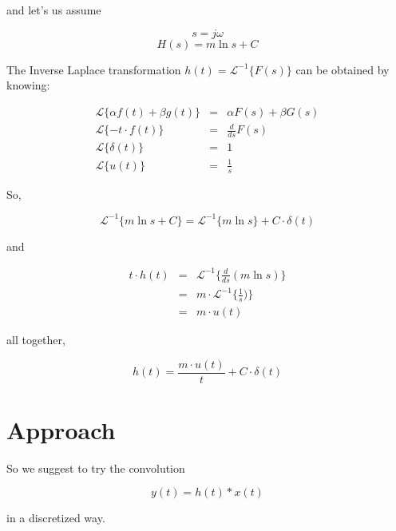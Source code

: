 \documentclass[a4paper,10pt]{article}
\newcommand{\laplace}{\mathcal{L}}
\begin{document}
and let's us assume

$$ s = j\omega $$
$$ H(s) = m \ln{s} + C $$

The Inverse Laplace transformation $h(t) = \laplace^{-1} \lbrace F(s) \rbrace $ can be obtained
by knowing:

\begin{eqnarray}
\laplace \lbrace \alpha f(t) + \beta g(t) \rbrace & = & \alpha F(s) + \beta G(s) \\
\laplace \lbrace -t \cdot f(t) \rbrace & = & \frac{d}{ds} F(s) \\
\laplace \lbrace \delta(t) \rbrace & = & 1 \\
\laplace \lbrace u(t) \rbrace & = & \frac{1}{s} 
\end{eqnarray}

So,

$$ \laplace^{-1} \lbrace m \ln{s} + C \rbrace = \laplace^{-1} \lbrace m \ln{s} \rbrace + C \cdot \delta(t) $$

and

\begin{eqnarray}
 t \cdot h(t) & = & \laplace^{-1} \lbrace \frac{d}{ds} (m \ln{s}) \rbrace \\
              & = & m \cdot \laplace^{-1} \lbrace \frac{1}{s}) \rbrace \\
              & = & m \cdot u(t)
\end{eqnarray}

all together,

\begin{equation}
  \boxed{ h(t) =  \frac{m \cdot u(t)}{t} + C \cdot \delta(t) }
\end{equation}

\section{Approach}

So we suggest to try the convolution

$$ y(t) = h(t) \ast x(t) $$

in a discretized way.
\end{document}
